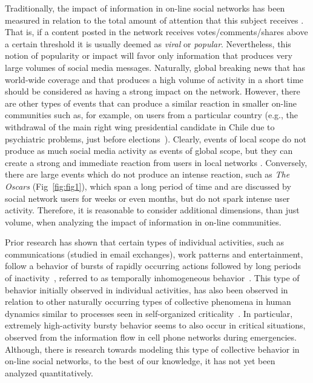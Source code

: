 Traditionally, the impact of information in on-line social networks has been
measured in relation to the total amount of attention that this subject receives
\cite{berger2012makes,iribarren2011branching,guerini2011exploring,mills2012virality,gaugaz2012predicting}.
%
That is, if a content posted in the network receives votes/comments/shares above
a certain threshold it is usually deemed as {\em viral} or {\em popular}.
%
Nevertheless, this notion of popularity or impact will favor only information
that produces very large volumes of social media messages. 
%
Naturally, global breaking news that has world-wide coverage and that produces a
high volume of activity in a short time should be considered as having a strong
impact on the network.  
%
However, there are other types of events that can produce a similar reaction in
smaller on-line communities such as, for example, on users from a particular
country (e.g., the withdrawal of the main right wing presidential candidate in
Chile due to psychiatric problems, just before
elections~\cite{chile_elections}). 
%
Clearly, events of local scope do not produce as much social media activity as
events of global scope, but they can create a strong and immediate reaction from
users in local networks \cite{ReisBOPKA15}. 
%
Conversely, there are large events which do not produce an intense reaction,
such as {\em The Oscars} (Fig~\ref{fig:fig1}), which span a long period of time
and are discussed by social network users for weeks or even months, but do not
spark intense user activity. 
%
Therefore, it is reasonable to consider additional dimensions, than just volume,
when analyzing the impact of information in on-line communities.  

Prior research has shown that certain types of individual activities, such as
communications (studied in email exchanges), work patterns and entertainment,
follow a behavior of bursts of rapidly occurring actions followed by long
periods of inactivity~\cite{barabasi2005origin}, referred to as {temporally
inhomogeneous} behavior~\cite{karsai2012universal}.  
%
This type of behavior initially observed in individual activities, has also been
observed in relation to other naturally occurring types of collective phenomena
in human dynamics similar to processes seen in self-organized
criticality~\cite{karsai2012universal}.  
%
In particular, extremely high-activity bursty behavior seems to also occur in
critical situations, observed from the information flow in cell phone networks
during emergencies\cite{gao2014quantifying}.  
%
Although, there is research towards modeling this type of collective behavior
\cite{yan2013information} in on-line social networks, to the best of our
knowledge, it has not yet been analyzed quantitatively.





